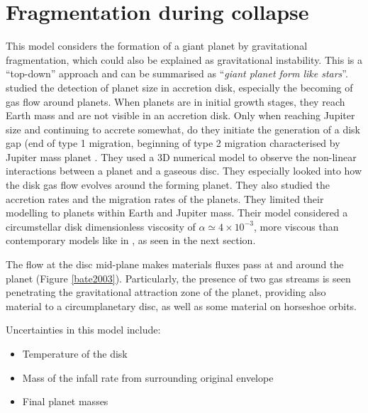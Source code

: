 \documentclass[12pt]{article} %
\begin{document}
\section{Fragmentation during collapse}\vspace{-2ex}\titlerule[1pt]\bigskip
This model considers the formation of a giant planet by gravitational fragmentation, which could also be explained as gravitational instability. This is a “top-down” approach and can be summarised as ``\textit{giant planet form like stars}''.\newline\linebreak
\cite{bate2003three} studied the detection of planet size in accretion disk, especially the becoming of gas flow around planets. When planets are in initial growth stages, they reach Earth mass and are not visible in an accretion disk. Only when reaching Jupiter size and continuing to accrete somewhat, do they initiate the generation of a disk gap (end of type 1 migration, beginning of type 2 migration characterised by Jupiter mass planet \cite{chambers2009planetary}.\newline\linebreak 
They used a 3D numerical model to observe the non-linear interactions between a planet and a gaseous disc. They especially looked into how the disk gas flow evolves around the forming planet. They also studied the accretion rates and the migration rates of the planets. They limited their modelling to planets within Earth and Jupiter mass. Their model considered a circumstellar disk dimensionless viscosity of $\alpha \simeq 4 \times 10 ^{-3}$, more viscous than contemporary models like in \cite{lissauer2009models}, as seen in the next section. \newline

\noindent The flow at the disc mid-plane makes materials fluxes pass at and around the planet (Figure \ref{bate2003}). Particularly, the presence of two gas streams is seen penetrating the gravitational attraction zone of the planet, providing also material to a circumplanetary disc, as well as some material on horseshoe orbits.\newline 


\noindent Uncertainties in this model include:
\begin{itemize}
\setlength\itemsep{0em}
\item Temperature of the disk
\item Mass of the infall rate from surrounding original envelope
\item Final planet masses
\end{itemize}
\end{document}
